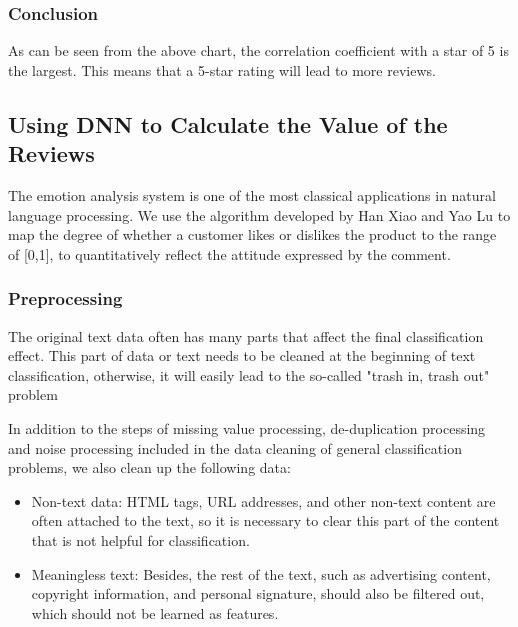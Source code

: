 \documentclass{mcmthesis}
\begin{document}
	\subsubsection{Conclusion}
	
	As can be seen from the above chart, the correlation coefficient with a star of 5 is the largest. This means that a 5-star rating will lead to more reviews.
	
	\subsection{Using DNN to Calculate the Value of the Reviews}
	The emotion analysis system is one of the most classical applications in natural language processing. We use the algorithm developed by Han Xiao and Yao Lu\cite{1} to map the degree of whether a customer likes or dislikes the product to the range of [0,1], to quantitatively reflect the attitude expressed by the comment.
	\subsubsection{Preprocessing}
	
	
	The original text data often has many parts that affect the final classification effect. This part of data or text needs to be cleaned at the beginning of text classification, otherwise, it will easily lead to the so-called "trash in, trash out" problem\cite{2}
	
	In addition to the steps of missing value processing, de-duplication processing and noise processing included in the data cleaning of general classification problems, we also clean up the following data:
	\begin{itemize}
		\item Non-text data: HTML tags, URL addresses, and other non-text content are often attached to the text, so it is necessary to clear this part of the content that is not helpful for classification.
		\item Meaningless text: Besides, the rest of the text, such as advertising content, copyright information, and personal signature, should also be filtered out, which should not be learned as features.
	\end{itemize}
\end{document}
